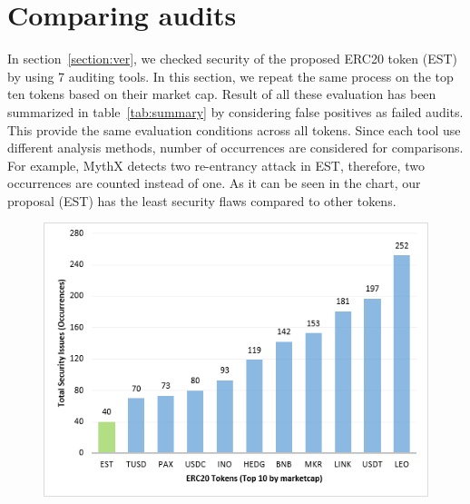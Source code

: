 
\section{Comparing audits}
In section~\ref{section:ver}, we checked security of the proposed ERC20 token (EST) by using 7 auditing tools. In this section, we repeat the same process on the top ten tokens based on their market cap\cite{EtherScan}. Result of all these evaluation has been summarized in table~\ref{tab:summary} by considering false positives as failed audits. This provide the same evaluation conditions across all tokens. Since each tool use different analysis methods, number of occurrences are considered for comparisons. For example, MythX detects two re-entrancy attack in EST, therefore, two occurrences are counted instead of one. As it can be seen in the chart, our proposal (EST) has the least security flaws compared to other tokens.

\begin{figure}[t!]
	\centering
	\includegraphics[width=0.8\linewidth]{figures/chart.png}
	\label{fig:chart}
\end{figure}


